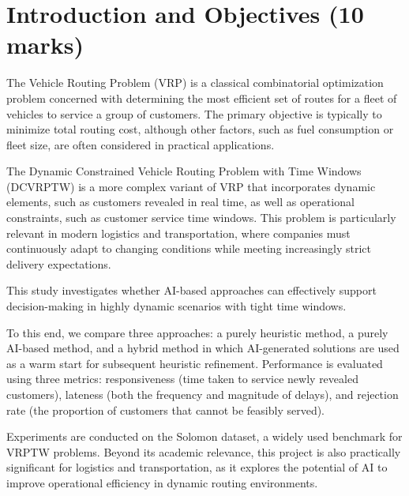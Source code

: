 \chapter{Introduction and Objectives (10 marks)}%
\label{chp:introduction}
The Vehicle Routing Problem (VRP) is a classical combinatorial optimization problem 
concerned with determining the most efficient set of routes for a fleet of vehicles 
to service a group of customers. The primary objective is typically to minimize total 
routing cost, although other factors, such as fuel consumption or fleet size, are often 
considered in practical applications.

The Dynamic Constrained Vehicle Routing Problem with Time Windows (DCVRPTW) is a more complex
variant of VRP that incorporates dynamic elements, such as customers revealed in real time,
as well as operational constraints, such as customer service time windows. This problem is
particularly relevant in modern logistics and transportation, where companies must continuously
adapt to changing conditions while meeting increasingly strict delivery expectations.

This study investigates whether AI-based approaches can effectively support decision-making in
highly dynamic scenarios with tight time windows.

To this end, we compare three approaches: a purely heuristic method, a purely AI-based method,
and a hybrid method in which AI-generated solutions are used as a warm start for subsequent
heuristic refinement. Performance is evaluated using three metrics: responsiveness (time taken
to service newly revealed customers), lateness (both the frequency and magnitude of delays), and
rejection rate (the proportion of customers that cannot be feasibly served).

Experiments are conducted on the Solomon dataset, a widely used benchmark for VRPTW problems.
Beyond its academic relevance, this project is also practically significant for logistics and
transportation, as it explores the potential of AI to improve operational efficiency in dynamic
routing environments.